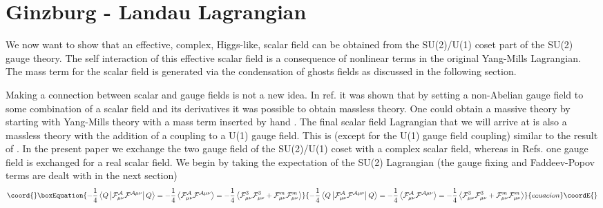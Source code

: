 \documentclass[a4paper,aps,showpacs]{revtex4}
\begin{document}
\section{Ginzburg - Landau Lagrangian}

We now want to show that an effective, complex, Higgs-like, scalar 
field can be obtained from the SU(2)/U(1) coset part of the SU(2) 
gauge theory. The self interaction of this effective scalar field is 
a consequence of nonlinear terms in the original Yang-Mills Lagrangian. 
The mass term for the scalar field is generated via the 
condensation of ghosts fields as discussed in the following section.

Making a connection between scalar and gauge fields is not a new idea. In
ref. \cite{corr} it was shown that by setting a non-Abelian gauge field to 
some combination of a scalar field and its
derivatives it was possible to obtain massless
\coordHE{} theory. One could
obtain a massive \coordHE{} theory by starting with
Yang-Mills theory with a mass term inserted by hand \cite{actor}. 
The final scalar field Lagrangian that we will arrive at is also
a massless \coordHE{} theory with the addition of a 
coupling to a U(1) gauge field. This is (except for the U(1) gauge
field coupling) similar to the result of \cite{corr}. In the present
paper we exchange the two gauge field of the SU(2)/U(1) coset 
with a complex scalar field, whereas in Refs. \cite{corr} \cite{actor}
one gauge field is exchanged for a real scalar field. We begin by taking 
the expectation of the SU(2) Lagrangian (the gauge fixing and Faddeev-Popov 
terms are dealt with in the next section)
\begin{equation}\coord{}\boxEquation{
  -\frac{1}{4}\left\langle Q \left| 
  \cal F^{\cal A}_{\mu \nu} \cal F^{\cal A \mu \nu}  
  \right | Q \right\rangle = 
  -\frac{1}{4} \left\langle 
  \cal F^{\cal A}_{\mu \nu} \cal F^{\cal A \mu \nu} 
  \right\rangle = 
  -\frac{1}{4} \left\langle 
  {\cal F}^3_{\mu \nu} {\cal F}^3_{\mu \nu} + 
  {\cal F}^m_{\mu \nu} {\cal F}^m_{\mu \nu} 
  \right\rangle 
\label{sec3-10}
}{
  -\frac{1}{4}\left\langle Q \left| 
  \cal F^{\cal A}_{\mu \nu} \cal F^{\cal A \mu \nu}  
  \right | Q \right\rangle = 
  -\frac{1}{4} \left\langle 
  \cal F^{\cal A}_{\mu \nu} \cal F^{\cal A \mu \nu} 
  \right\rangle = 
  -\frac{1}{4} \left\langle 
  {\cal F}^3_{\mu \nu} {\cal F}^3_{\mu \nu} + 
  {\cal F}^m_{\mu \nu} {\cal F}^m_{\mu \nu} 
  \right\rangle 
}{ecuacion}\coordE{}\end{equation}
\end{document}
